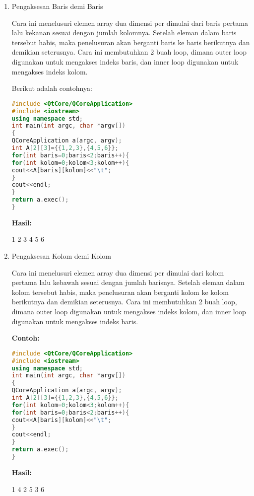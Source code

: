 \begin{enumerate}
\item Pengaksesan Baris demi Baris

Cara ini menelusuri elemen array dua dimensi per dimulai dari baris
pertama lalu kekanan sesuai dengan jumlah kolomnya. Setelah eleman dalam
baris tersebut habis, maka penelusuran akan berganti baris ke baris
berikutnya dan demikian seterusnya. Cara ini membutuhkan 2 buah loop,
dimana outer loop digunakan untuk mengakses indeks baris, dan inner loop
digunakan untuk mengakses indeks kolom.

Berikut adalah contohnya:

\begin{lstlisting}[language=c++, caption=Pengaksesan Baris demi Baris, label=contoh3-13]
#include <QtCore/QCoreApplication>
#include <iostream>
using namespace std;
int main(int argc, char *argv[])
{
QCoreApplication a(argc, argv);
int A[2][3]={{1,2,3},{4,5,6}};
for(int baris=0;baris<2;baris++){
for(int kolom=0;kolom<3;kolom++){
cout<<A[baris][kolom]<<"\t";
}
cout<<endl;
}
return a.exec();
}
\end{lstlisting}

\textbf{Hasil:}

\begin{lcverbatim}
1 2 3
4 5 6
\end{lcverbatim}

\item Pengaksesan Kolom demi Kolom

Cara ini menelusuri elemen array dua dimensi per dimulai dari kolom
pertama lalu kebawah sesuai dengan jumlah barisnya. Setelah eleman dalam
kolom tersebut habis, maka penelusuran akan berganti kolom ke kolom
berikutnya dan demikian seterusnya. Cara ini membutuhkan 2 buah loop,
dimana outer loop digunakan untuk mengakses indeks kolom, dan inner loop
digunakan untuk mengakses indeks baris.

\textbf{Contoh:}

\begin{lstlisting}[language=c++, caption=Pengaksesan Kolom demi Kolom, label=contoh3-14]
#include <QtCore/QCoreApplication>
#include <iostream>
using namespace std;
int main(int argc, char *argv[])
{
QCoreApplication a(argc, argv);
int A[2][3]={{1,2,3},{4,5,6}};
for(int kolom=0;kolom<3;kolom++){
for(int baris=0;baris<2;baris++){
cout<<A[baris][kolom]<<"\t";
}
cout<<endl;
}
return a.exec();
}
\end{lstlisting}

\textbf{Hasil:}

\begin{lcverbatim}
1 4
2 5
3 6
\end{lcverbatim}

\end{enumerate}







